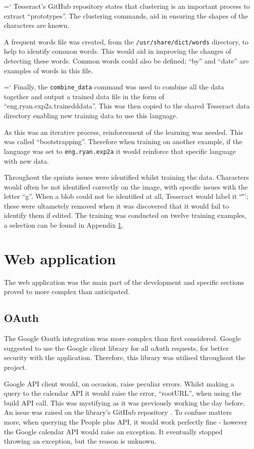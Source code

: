 {{{{{{\ttfamily \hyphenchar\the\font=`\-}%
Tesseract's GitHub repository states that clustering is an important process to extract ``prototypes''. The clustering commands, aid in ensuring the shapes of the characters are known.

A frequent words file was created, from the \texttt{/usr/share/dict/words} directory, to help to identify common words. This would aid in improving the changes of detecting these words. Common words could also be defined; ``by'' and ``date'' are examples of words in this file.

{{\ttfamily \hyphenchar\the\font=`\-}%
Finally, the \texttt{combine\_data} command was used to combine all the data together and output a trained data file in the form of ``eng.ryan.exp2a.trainedddata''. This was then copied to the shared Tesseract data directory enabling new training data to use this language.

As this was an iterative process, reinforcement of the learning was needed. This was called ``bootstrapping''. Therefore when training on another example, if the language was set to \texttt{eng.ryan.exp2a} it would reinforce that specific language with new data.

Throughout the sprints issues were identified whilst training the data. Characters would often be not identified correctly on the image, with specific issues with the letter ``g''. When a blob could not be identified at all, Tesseract would label it ``\~''; these were ultametely removed when it was discovered that it would fail to identify them if edited. The training was conducted on twelve training examples, a selection can be found in Appendix \ref{}.

\section{Web application}
The web application was the main part of the development and specific sections proved to more complex than anticipated.

\subsection{OAuth}\label{app:oauth}
The Google Oauth integration was more complex than first considered. Google suggested to use the Google client library for all oAuth requests, for better security with the application. Therefore, this library was utilised throughout the project.

Google API client would, on occasion, raise peculiar errors. Whilst making a query to the calendar API it would raise the error, ``rootURL'', when using the build API call. This was mystifying as it was previously working the day before.  An issue was raised on the library's GitHub repository \cite{citeulike:14021433}. To confuse matters more, when querying the People plus API, it would work perfectly fine - however the Google calendar API would raise an exception. It eventually stopped throwing an exception, but the reason is unknown.

}}}}}}

